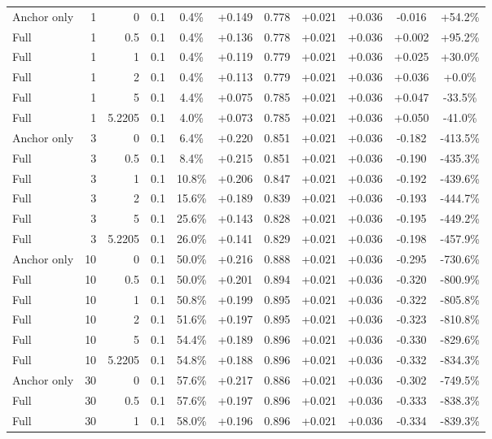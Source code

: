 \begin{table}[htbp]
\begin{tabular}{lrrrccccccc}
Anchor only & 1 & 0 & 0.1 & 0.4\% & +0.149 & 0.778 & +0.021 & +0.036 & -0.016 & +54.2\% \\
Full & 1 & 0.5 & 0.1 & 0.4\% & +0.136 & 0.778 & +0.021 & +0.036 & +0.002 & +95.2\% \\
Full & 1 & 1 & 0.1 & 0.4\% & +0.119 & 0.779 & +0.021 & +0.036 & +0.025 & +30.0\% \\
Full & 1 & 2 & 0.1 & 0.4\% & +0.113 & 0.779 & +0.021 & +0.036 & +0.036 & +0.0\% \\
Full & 1 & 5 & 0.1 & 4.4\% & +0.075 & 0.785 & +0.021 & +0.036 & +0.047 & -33.5\% \\
Full & 1 & 5.2205 & 0.1 & 4.0\% & +0.073 & 0.785 & +0.021 & +0.036 & +0.050 & -41.0\% \\
Anchor only & 3 & 0 & 0.1 & 6.4\% & +0.220 & 0.851 & +0.021 & +0.036 & -0.182 & -413.5\% \\
Full & 3 & 0.5 & 0.1 & 8.4\% & +0.215 & 0.851 & +0.021 & +0.036 & -0.190 & -435.3\% \\
Full & 3 & 1 & 0.1 & 10.8\% & +0.206 & 0.847 & +0.021 & +0.036 & -0.192 & -439.6\% \\
Full & 3 & 2 & 0.1 & 15.6\% & +0.189 & 0.839 & +0.021 & +0.036 & -0.193 & -444.7\% \\
Full & 3 & 5 & 0.1 & 25.6\% & +0.143 & 0.828 & +0.021 & +0.036 & -0.195 & -449.2\% \\
Full & 3 & 5.2205 & 0.1 & 26.0\% & +0.141 & 0.829 & +0.021 & +0.036 & -0.198 & -457.9\% \\
Anchor only & 10 & 0 & 0.1 & 50.0\% & +0.216 & 0.888 & +0.021 & +0.036 & -0.295 & -730.6\% \\
Full & 10 & 0.5 & 0.1 & 50.0\% & +0.201 & 0.894 & +0.021 & +0.036 & -0.320 & -800.9\% \\
Full & 10 & 1 & 0.1 & 50.8\% & +0.199 & 0.895 & +0.021 & +0.036 & -0.322 & -805.8\% \\
Full & 10 & 2 & 0.1 & 51.6\% & +0.197 & 0.895 & +0.021 & +0.036 & -0.323 & -810.8\% \\
Full & 10 & 5 & 0.1 & 54.4\% & +0.189 & 0.896 & +0.021 & +0.036 & -0.330 & -829.6\% \\
Full & 10 & 5.2205 & 0.1 & 54.8\% & +0.188 & 0.896 & +0.021 & +0.036 & -0.332 & -834.3\% \\
Anchor only & 30 & 0 & 0.1 & 57.6\% & +0.217 & 0.886 & +0.021 & +0.036 & -0.302 & -749.5\% \\
Full & 30 & 0.5 & 0.1 & 57.6\% & +0.197 & 0.896 & +0.021 & +0.036 & -0.333 & -838.3\% \\
Full & 30 & 1 & 0.1 & 58.0\% & +0.196 & 0.896 & +0.021 & +0.036 & -0.334 & -839.3\% \\

\end{tabular}
\end{table}
